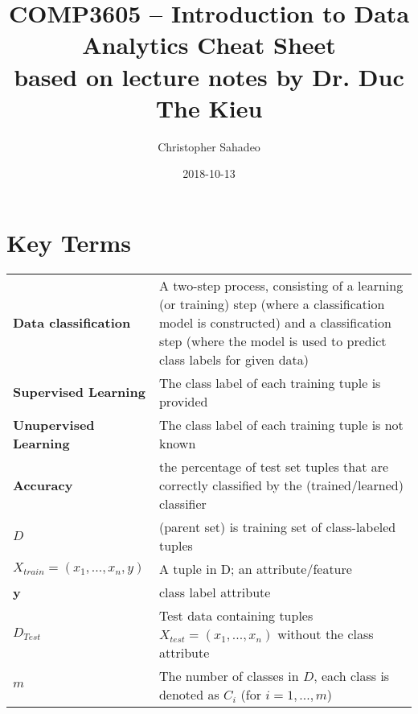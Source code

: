 \documentclass{article}
\title{COMP3605 – Introduction to Data Analytics Cheat Sheet\\[0.005em]\smaller{}based on lecture notes by Dr. Duc The Kieu}
\date{2018-10-13}
\author{Christopher Sahadeo}
\begin{document}
    \maketitle
    \tableofcontents

    \newpage

    \part{Key Terms}


    \renewcommand*{\arraystretch}{1.4}
    \begin{longtable}{Rp{13cm}}
                \textbf{Data classification} & A two-step process, consisting of a learning (or training) step (where a classification model is constructed) and a classification step (where the model is used to predict class labels for given data)\\

                \textbf{Supervised Learning} & The class label of each training tuple is provided\\

                \textbf{Unupervised Learning} & The class label of each training tuple is not known\\

                \textbf{Accuracy} & the percentage of test set tuples that are correctly classified by the (trained/learned) classifier\\

                \textbf{$D$} & (parent set) is training set of class-labeled tuples\\

                \textbf{$X_{train} = (x_1,...,x_n,y)$} & A tuple in D; an attribute/feature\\

                \textbf{y} & class label attribute\\

                \textbf{$D_{Test}$} & Test data containing tuples $X_{test} = (x_1,...,x_n)$ without the class attribute\\

                \textbf{$m$} & The number of classes in \textbf{$D$}, each class is denoted as $C_i$ (for $i = 1, ..., m$)\\


\end{longtable}
\end{document}
